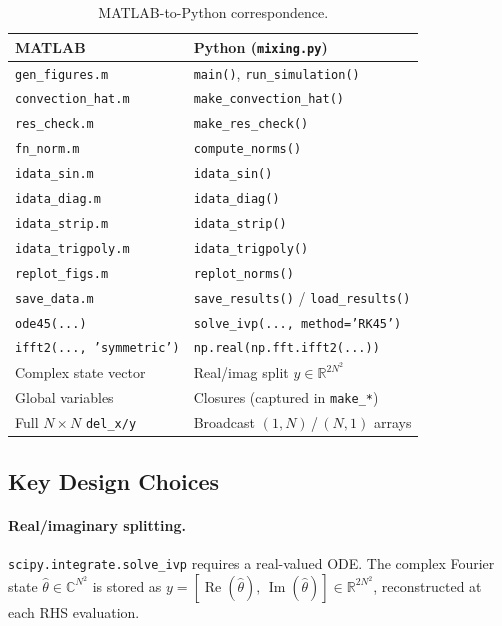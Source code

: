 \documentclass[12pt,a4paper]{article}
\theoremstyle{definition}
\theoremstyle{plain}
\begin{document}
\begin{table}[H]
  \centering
  \caption{MATLAB-to-Python correspondence.}
  \label{tab:matlab}
  \begin{tabular}{ll}
    \toprule
    MATLAB & Python (\texttt{mixing.py}) \\
    \midrule
    \texttt{gen\_figures.m} & \texttt{main()}, \texttt{run\_simulation()} \\
    \texttt{convection\_hat.m} & \texttt{make\_convection\_hat()} \\
    \texttt{res\_check.m} & \texttt{make\_res\_check()} \\
    \texttt{fn\_norm.m} & \texttt{compute\_norms()} \\
    \texttt{idata\_sin.m} & \texttt{idata\_sin()} \\
    \texttt{idata\_diag.m} & \texttt{idata\_diag()} \\
    \texttt{idata\_strip.m} & \texttt{idata\_strip()} \\
    \texttt{idata\_trigpoly.m} & \texttt{idata\_trigpoly()} \\
    \texttt{replot\_figs.m} & \texttt{replot\_norms()} \\
    \texttt{save\_data.m} & \texttt{save\_results()} / \texttt{load\_results()} \\
    \midrule
    \texttt{ode45(...)} & \texttt{solve\_ivp(..., method='RK45')} \\
    \texttt{ifft2(..., 'symmetric')} & \texttt{np.real(np.fft.ifft2(...))} \\
    Complex state vector & Real/imag split $y\in\mathbb{R}^{2N^2}$ \\
    Global variables & Closures (captured in \texttt{make\_*}) \\
    Full $N\times N$ \texttt{del\_x/y} & Broadcast $(1,N)$\,/\,$(N,1)$ arrays \\
    \bottomrule
  \end{tabular}
\end{table}

\subsection{Key Design Choices}

\paragraph{Real/imaginary splitting.}
\texttt{scipy.integrate.solve\_ivp} requires a real-valued ODE.
The complex Fourier state $\hat\theta\in\mathbb{C}^{N^2}$ is stored as
$y = [\operatorname{Re}(\hat\theta),\,\operatorname{Im}(\hat\theta)]
\in\mathbb{R}^{2N^2}$, reconstructed at each RHS evaluation.
\end{document}
